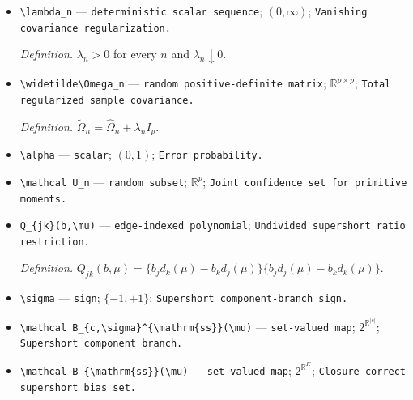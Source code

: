 \documentclass{article}
\begin{document}
\begin{itemize}
  \par\smallskip\noindent\emph{Definition.} \(\widehat\Omega_n=n^{-1}\sum_{r=1}^n\{h(O_{nr})-\bar h_n\}\{h(O_{nr})-\bar h_n\}^\top\).
  \item \texttt{\textbackslash{}\allowbreak{}lambda\_\allowbreak{}n} --- \texttt{deterministic scalar sequence}; \((0,\infty)\); \texttt{Vanishing covariance regularization.}
  \par\smallskip\noindent\emph{Definition.} \(\lambda_n>0\) for every \(n\) and \(\lambda_n\downarrow0\).
  \item \texttt{\textbackslash{}\allowbreak{}widetilde\textbackslash{}\allowbreak{}Omega\_\allowbreak{}n} --- \texttt{random positive-\allowbreak{}definite matrix}; \(\mathbb R^{p\times p}\); \texttt{Total regularized sample covariance.}
  \par\smallskip\noindent\emph{Definition.} \(\widetilde\Omega_n=\widehat\Omega_n+\lambda_n I_p\).
  \item \texttt{\textbackslash{}\allowbreak{}alpha} --- \texttt{scalar}; \((0,1)\); \texttt{Error probability.}
  \item \texttt{\textbackslash{}\allowbreak{}mathcal U\_\allowbreak{}n} --- \texttt{random subset}; \(\mathbb R^p\); \texttt{Joint confidence set for primitive moments.}
  \item \texttt{Q\_\allowbreak{}\{jk\}\allowbreak{}(b,\allowbreak{}\textbackslash{}\allowbreak{}mu)} --- \texttt{edge-\allowbreak{}indexed polynomial}; \texttt{Undivided supershort ratio restriction.}
  \par\smallskip\noindent\emph{Definition.} \(Q_{jk}(b,\mu)=\{b_jd_k(\mu)-b_kd_j(\mu)\}\{b_jd_j(\mu)-b_kd_k(\mu)\}\).
  \item \texttt{\textbackslash{}\allowbreak{}sigma} --- \texttt{sign}; \(\{-1,+1\}\); \texttt{Supershort component-\allowbreak{}branch sign.}
  \item \texttt{\textbackslash{}\allowbreak{}mathcal B\_\allowbreak{}\{c,\allowbreak{}\textbackslash{}\allowbreak{}sigma\}\allowbreak{}\textasciicircum{}\{\textbackslash{}\allowbreak{}mathrm\{ss\}\allowbreak{}\}\allowbreak{}(\textbackslash{}\allowbreak{}mu)} --- \texttt{set-\allowbreak{}valued map}; \(2^{\mathbb R^{|c|}}\); \texttt{Supershort component branch.}
  \item \texttt{\textbackslash{}\allowbreak{}mathcal B\_\allowbreak{}\{\textbackslash{}\allowbreak{}mathrm\{ss\}\allowbreak{}\}\allowbreak{}(\textbackslash{}\allowbreak{}mu)} --- \texttt{set-\allowbreak{}valued map}; \(2^{\mathbb R^K}\); \texttt{Closure-\allowbreak{}correct supershort bias set.}

\end{itemize}
\end{document}
